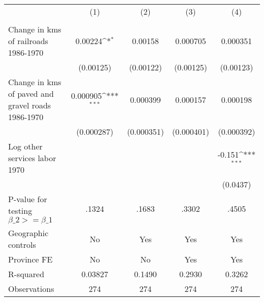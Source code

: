 {
\def\sym#1{\ifmmode^{#1}\else\(^{#1}\)\fi}
\begin{tabular}{l*{4}{c}}
\hline\hline
                &\multicolumn{1}{c}{(1)}&\multicolumn{1}{c}{(2)}&\multicolumn{1}{c}{(3)}&\multicolumn{1}{c}{(4)}\\
                &\multicolumn{1}{c}{}&\multicolumn{1}{c}{}&\multicolumn{1}{c}{}&\multicolumn{1}{c}{}\\
\hline
Change in kms of railroads 1986-1970&  0.00224\sym{*}  &  0.00158         & 0.000705         & 0.000351         \\
                &(0.00125)         &(0.00122)         &(0.00125)         &(0.00123)         \\
[1em]
Change in kms of paved and gravel roads 1986-1970& 0.000905\sym{***}& 0.000399         & 0.000157         & 0.000198         \\
                &(0.000287)         &(0.000351)         &(0.000401)         &(0.000392)         \\
[1em]
Log other services labor 1970&                  &                  &                  &   -0.151\sym{***}\\
                &                  &                  &                  & (0.0437)         \\
\hline
P-value for testing $\beta\_{2} >= \beta\_{1}$&    .1324         &    .1683         &    .3302         &    .4505         \\
Geographic controls&       No         &      Yes         &      Yes         &      Yes         \\
Province FE     &       No         &       No         &      Yes         &      Yes         \\
R-squared       &  0.03827         &   0.1490         &   0.2930         &   0.3262         \\
Observations    &      274         &      274         &      274         &      274         \\
\hline\hline
\end{tabular}
}
